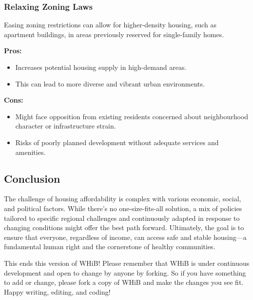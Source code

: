 \subsubsection*{Relaxing Zoning Laws}
Easing zoning restrictions can allow for higher-density housing, such as apartment buildings, in areas previously reserved for single-family homes.

\textbf{Pros:}
\begin{itemize}
    \item Increases potential housing supply in high-demand areas.
    \item This can lead to more diverse and vibrant urban environments.
\end{itemize}

\textbf{Cons:}
\begin{itemize}
    \item Might face opposition from existing residents concerned about neighbourhood character or infrastructure strain.
    \item Risks of poorly planned development without adequate services and amenities.
\end{itemize}

\subsection*{Conclusion}
The challenge of housing affordability is complex with various economic, social, and political factors. While there's no one-size-fits-all solution, a mix of policies tailored to specific regional challenges and continuously adapted in response to changing conditions might offer the best path forward. Ultimately, the goal is to ensure that everyone, regardless of income, can access safe and stable housing—a fundamental human right and the cornerstone of healthy communities.

This ends this version of WHiB! Please remember that WHiB is under continuous development and open to change by anyone by forking. So if you have something to add or change, please fork a copy of WHiB and make the changes you see fit. Happy writing, editing, and coding!
